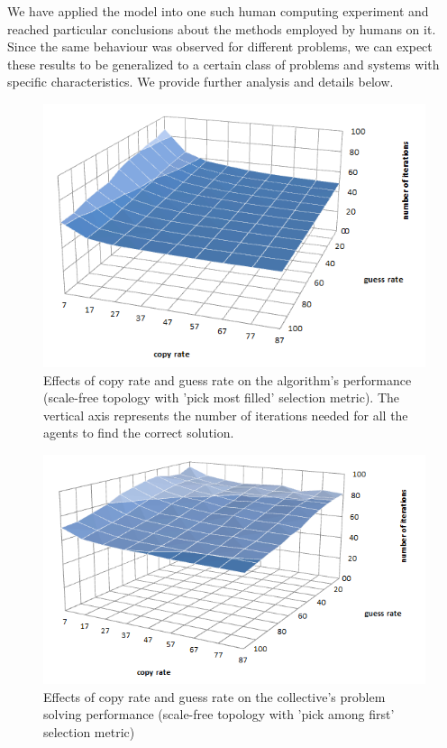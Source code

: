 \documentclass{article}
\begin{document}
We have applied the model into one such human computing experiment and reached particular conclusions about the methods employed by humans on it. Since the same behaviour was observed for different problems, we can expect these results to be generalized to a certain class of problems and systems with specific characteristics. We provide further analysis and details below.

\begin{figure}
\includegraphics[scale=0.60]{copy_guess_free_most}
\caption{Effects of copy rate and guess rate on the algorithm's performance (scale-free topology with 'pick most filled' selection metric). The vertical axis represents the number of iterations needed for all the agents to find the correct solution.
}
\label{fig:copy_guess_free_most}
\end{figure}

\begin{figure}
\includegraphics[scale=0.60]{copy_guess_free_prob}
\caption{Effects of copy rate and guess rate on the collective's problem solving performance (scale-free topology with 'pick among first' selection metric)
}
\label{fig:copy_guess_free_prob}
\end{figure}
\end{document}
